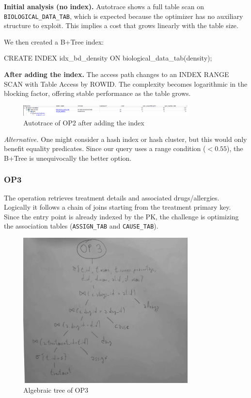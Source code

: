 \documentclass[11pt,a4paper]{article}
\begin{document}
\textbf{Initial analysis (no index).} Autotrace shows a full table scan on \texttt{BIOLOGICAL\_DATA\_TAB}, which is expected because the optimizer has no auxiliary structure to exploit. This implies a cost that grows linearly with the table size.  

We then created a B+Tree index:  

\begin{sqlbox}
CREATE INDEX idx_bd_density ON biological_data_tab(density);
\end{sqlbox}

\textbf{After adding the index.} The access path changes to an INDEX RANGE SCAN with Table Access by ROWID. The complexity becomes logarithmic in the blocking factor, offering stable performance as the table grows.  

\begin{figure}[H]
  \centering
  \includegraphics[width=0.8\textwidth]{img/op2_autotrace_after.png}
  \caption{Autotrace of OP2 after adding the index}
\end{figure}

\textit{Alternative.} One might consider a hash index or hash cluster, but this would only benefit equality predicates. Since our query uses a range condition (\(< 0.55\)), the B+Tree is unequivocally the better option.

\subsubsection*{OP3}

The operation retrieves treatment details and associated drugs/allergies. Logically it follows a chain of joins starting from the treatment primary key. Since the entry point is already indexed by the PK, the challenge is optimizing the association tables (\texttt{ASSIGN\_TAB} and \texttt{CAUSE\_TAB}).  

\begin{figure}[H]
  \centering
  \includegraphics[width=0.8\textwidth]{img/op3_algebra.png}
  \caption{Algebraic tree of OP3}
\end{figure}
\end{document}
